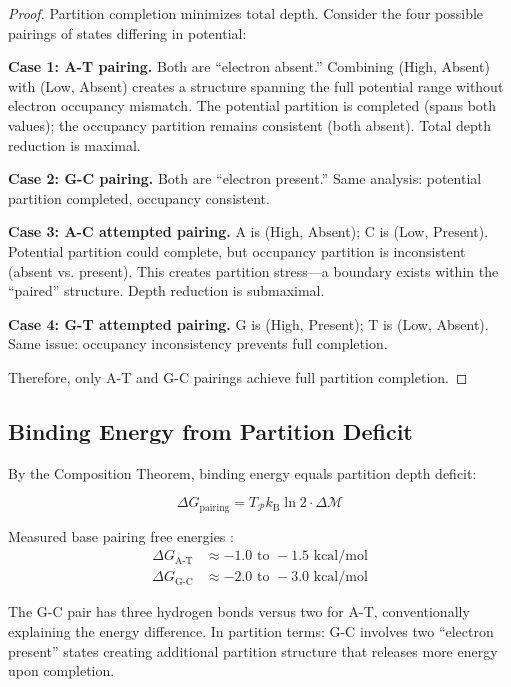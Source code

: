 \documentclass[twocolumn,10pt,a4paper]{article}
\theoremstyle{definition}
\theoremstyle{remark}
\newcommand{\kB}{k_{\mathrm{B}}}
\newcommand{\Depth}{\mathcal{M}}
\newcommand{\Partition}{\mathcal{P}}
\begin{document}
\begin{proof}
Partition completion minimizes total depth. Consider the four possible pairings of states differing in potential:

\textbf{Case 1: A-T pairing.} Both are ``electron absent.'' Combining (High, Absent) with (Low, Absent) creates a structure spanning the full potential range without electron occupancy mismatch. The potential partition is completed (spans both values); the occupancy partition remains consistent (both absent). Total depth reduction is maximal.

\textbf{Case 2: G-C pairing.} Both are ``electron present.'' Same analysis: potential partition completed, occupancy consistent.

\textbf{Case 3: A-C attempted pairing.} A is (High, Absent); C is (Low, Present). Potential partition could complete, but occupancy partition is inconsistent (absent vs. present). This creates partition stress---a boundary exists within the ``paired'' structure. Depth reduction is submaximal.

\textbf{Case 4: G-T attempted pairing.} G is (High, Present); T is (Low, Absent). Same issue: occupancy inconsistency prevents full completion.

Therefore, only A-T and G-C pairings achieve full partition completion.
\end{proof}

\subsection{Binding Energy from Partition Deficit}

By the Composition Theorem, binding energy equals partition depth deficit:

\begin{equation}
    \Delta G_{\text{pairing}} = T_{\Partition} \kB \ln 2 \cdot \Delta\Depth
\end{equation}

Measured base pairing free energies \cite{santalucia1998}:
\begin{align}
    \Delta G_{\text{A-T}} &\approx -1.0 \text{ to } -1.5 \text{ kcal/mol} \\
    \Delta G_{\text{G-C}} &\approx -2.0 \text{ to } -3.0 \text{ kcal/mol}
\end{align}

The G-C pair has three hydrogen bonds versus two for A-T, conventionally explaining the energy difference. In partition terms: G-C involves two ``electron present'' states creating additional partition structure that releases more energy upon completion.
\end{document}
